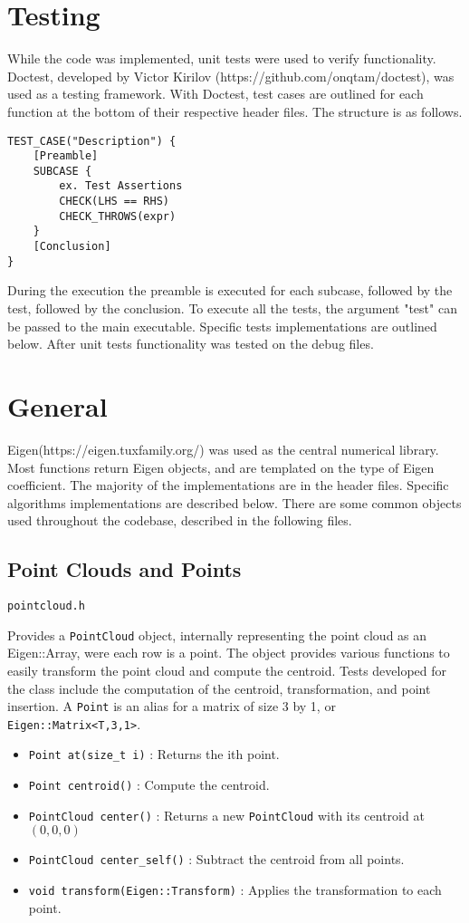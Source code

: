\documentclass[letterpaper, 11pt]{report}
\begin{document}
\section{Testing}
While the code was implemented, unit tests were used to verify functionality. Doctest, developed by Victor Kirilov (https://github.com/onqtam/doctest), was used as a testing framework. With Doctest, test cases are outlined for each function at the bottom of their respective header files. The structure is as follows.
\begin{verbatim}
TEST_CASE("Description") {
	[Preamble]
    SUBCASE {
        ex. Test Assertions
        CHECK(LHS == RHS)
        CHECK_THROWS(expr)
    } 
    [Conclusion]
}
\end{verbatim}

During the execution the preamble is executed for each subcase, followed by the test, followed by the conclusion. To execute all the tests, the argument "test" can be passed to the main executable. Specific tests implementations are outlined below. After unit tests functionality was tested on the debug files.

\section{General}
Eigen(https://eigen.tuxfamily.org/) was used as the central numerical library. Most functions return Eigen objects, and are templated on the type of Eigen coefficient.
The majority of the implementations are in the header files. Specific algorithms implementations are described below. There are some common objects used throughout the codebase, described in the following files.
\subsection{Point Clouds and Points}
\begin{verbatim}
pointcloud.h
\end{verbatim}
Provides a \texttt{PointCloud} object, internally representing the point cloud as an Eigen::Array, were each row is a point. The object provides various functions to easily transform the point cloud and compute the centroid. Tests developed for the class include the computation of the centroid, transformation, and point insertion. A \texttt{Point} is an alias for a matrix of size 3 by 1, or \texttt{Eigen::Matrix<T,3,1>}.
\begin{itemize}
\item \texttt{Point at(size\_t i)} : Returns the ith point.
\item \texttt{Point centroid()} : Compute the centroid.
\item \texttt{PointCloud center()} : Returns a new \texttt{PointCloud} with its centroid at $(0,0,0)$
\item \texttt{PointCloud center\_self()} : Subtract the centroid from all points.
\item \texttt{void transform(Eigen::Transform)} : Applies the transformation to each point.
\end{itemize}
\end{document}
